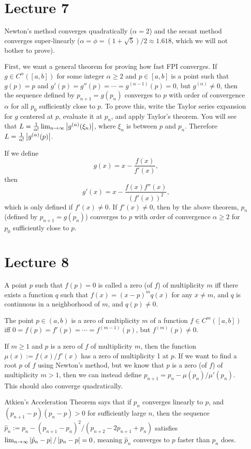 \documentclass{article}
\begin{document}
\section{Lecture 7}
Newton's method converges quadratically ($\alpha = 2$) and the secant method converges super-linearly ($\alpha =\phi = (1 + \sqrt{5})/2 \approx 1.618$, which we will not bother to prove).
\par
First, we want a general theorem for proving how fast FPI converges. If $g \in C^\alpha([a,b])$ for some integer $\alpha \geq 2$ and $p \in [a,b]$ is a point such that $g(p)=p$ and $g'(p)=g''(p)=\cdots = g^{(\alpha-1)}(p)=0$, but $g^{(\alpha)} \neq 0$, then the sequence defined by $p_{n+1}=g(p_n)$ converges to $p$ with order of convergence $\alpha$ for all $p_0$ sufficiently close to $p$. To prove this, write the Taylor series expansion for $g$ centered at $p$, evaluate it at $p_n$, and apply Taylor's theorem. You will see that $L = \frac{1}{\alpha!} \lim_{n \rightarrow \infty} \left\lvert g^{(\alpha)}(\xi_n) \right\rvert$, where $\xi_n$ is between $p$ and $p_n$. Therefore $L = \frac{1}{\alpha!} \left\lvert g^{(\alpha)} (p) \right\rvert$.
\par
If we define
\[ g(x) = x - \frac{f(x)}{f'(x)}, \]
then
\[ g'(x) = x - \frac{f(x)f''(x)}{(f'(x))^2}, \]
which is only defined if $f'(x) \neq 0$. If $f'(x) \neq 0$, then by the above theorem, $p_n$ (defined by $p_{n+1} = g(p_n)$) converges to $p$ with order of convergence $\alpha \geq 2$ for $p_0$ sufficiently close to $p$.

\section{Lecture 8}
A point $p$ such that $f(p)=0$ is called a zero (of $f$) of multiplicity $m$ iff there exists a function $q$ such that $f(x) = (x-p)^m q(x)$ for any $x \neq m$, and $q$ is continuous in a neighborhood of $m$, and $q(p) \neq 0$.
\par
The point $p \in (a,b)$ is a zero of multiplicity $m$ of a function $f \in C^m([a,b])$ iff $0 = f(p) = f'(p) = \cdots = f^{(m-1)}(p)$, but $f^{(m)}(p) \neq 0$.
\par
If $m \geq 1$ and $p$ is a zero of $f$ of multiplicity $m$, then the function $\mu(x) := f(x)/f'(x)$ has a zero of multiplicity 1 at $p$. If we want to find a root $p$ of $f$ using Newton's method, but we know that $p$ is a zero (of $f$) of multiplicity $m > 1$, then we can instead define $p_{n+1} = p_n - \mu(p_n)/\mu'(p_n)$. This should also converge quadratically.
\par
Atkien's Acceleration Theorem says that if $p_n$ converges linearly to $p$, and $(p_{n+1}-p)(p_n-p)>0$ for sufficiently large $n$, then the sequence $\hat{p}_n := p_n - (p_{n+1}-p_n)^2/(p_{n+2}-2p_{n+1}+p_n)$ satisfies $\lim_{n \rightarrow \infty} \left\lvert \hat{p}_n-p \right\rvert/\left\lvert p_n-p \right\rvert = 0$, meaning $\hat{p}_n$ converges to $p$ faster than $p_n$ does.
\end{document}
